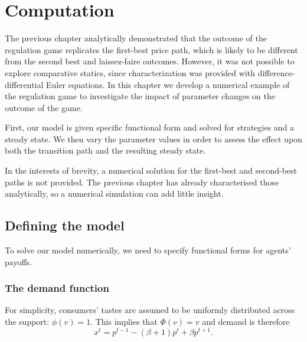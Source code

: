 \chapter{Computation}

\label{cha:computation}


The previous chapter analytically demonstrated that the outcome of the
regulation game replicates the first-best price path, which is likely to be
different from the second best and laissez-faire outcomes. However, it was
not possible to explore comparative statics, since characterization was
provided with difference-differential Euler equations. In this chapter we
develop a numerical example of the regulation game to investigate the impact
of parameter changes on the outcome of the game.

First, our model is given specific functional form and solved for strategies
and a steady state. We then vary the parameter values in order to assess the
effect upon both the transition path and the resulting steady state.

In the interests of brevity, a numerical solution for the first-best and
second-best paths is not provided. The previous chapter has already
characterised those analytically, so a numerical simulation can add little
insight.

\section{Defining the model}

\label{sec:defining-model}

To solve our model numerically, we need to specify functional forms for
agents' payoffs.

\subsection{The demand function}

\label{sec:demand-function-1}

For simplicity, consumers' tastes are assumed to be uniformly distributed
across the support: $\phi(v) = 1$. This implies that $\Phi(v) = v$ and
demand is therefore 
\begin{equation}  \label{eq:21}
x^t = p^{t-1} - (\beta+1)p^t + \beta p^{t+1}.
\end{equation}

